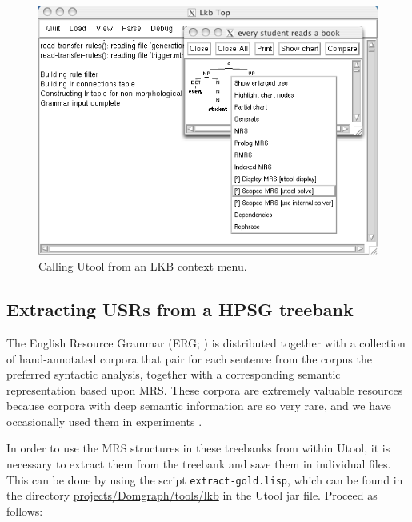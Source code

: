 \begin{figure}
\begin{center}
\includegraphics[width=0.8 \textwidth]{lkb-integration}
\end{center}
\caption{Calling Utool from an LKB context menu.
\label{fig:lkb-integration}}
\end{figure}


\subsection{Extracting USRs from a HPSG treebank}
\label{sec:treebank}

The English Resource Grammar (ERG; )
is distributed together with a collection of hand-annotated corpora that pair for each sentence from the corpus
the preferred syntactic analysis, together with a corresponding
semantic representation based upon MRS. These corpora are extremely
valuable resources because corpora with deep semantic information are
so very rare, and we have occasionally used them in experiments
\cite{FucKolNieTha04,FliKolTha05}.

In order to use the MRS structures in these treebanks from within Utool, it is
necessary to extract them from the treebank and save them in
individual files. This can be done by using the script
\verb|extract-gold.lisp|, which can be found in the directory
\url{projects/Domgraph/tools/lkb} in the Utool jar file. Proceed as
follows:

